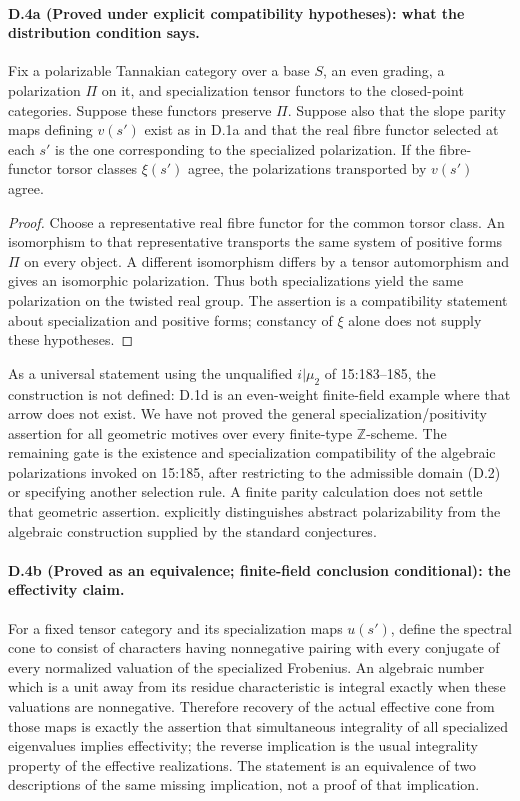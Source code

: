 \paragraph{D.4a (Proved under explicit compatibility hypotheses): what the distribution condition says.}
Fix a polarizable Tannakian category over a base $S$, an even grading,
a polarization $\Pi$ on it, and specialization tensor functors to the
closed-point categories. Suppose these functors preserve $\Pi$. Suppose
also that the slope parity maps defining $v(s')$ exist as in D.1a and
that the real fibre functor selected at each $s'$ is the one corresponding
to the specialized polarization. If the fibre-functor torsor classes
$\xi(s')$ agree, the polarizations transported by $v(s')$ agree.

\begin{proof}
Choose a representative real fibre functor for the common torsor class.
An isomorphism to that representative transports the same system of
positive forms $\Pi$ on every object. A different isomorphism differs
by a tensor automorphism and gives an isomorphic polarization. Thus both
specializations yield the same polarization on the twisted real group.
The assertion is a compatibility statement about specialization and
positive forms; constancy of $\xi$ alone does not supply these hypotheses.
\end{proof}

As a universal statement using the unqualified $i|\mu _2$ of 15:183--185,
the construction is not defined: D.1d is an even-weight finite-field
example where that arrow does not exist. We have not proved the general
specialization/positivity assertion for all geometric motives over every
finite-type $\mathbb Z$-scheme. The remaining gate is the existence and
specialization compatibility of the algebraic polarizations invoked on
15:185, after restricting to the admissible domain (D.2) or specifying
another selection rule. A finite parity calculation does not settle that
geometric assertion. \citet[Remark 2.47]{D_Milne1994} explicitly distinguishes
abstract polarizability from the algebraic construction supplied by the
standard conjectures.

\paragraph{D.4b (Proved as an equivalence; finite-field conclusion conditional): the effectivity claim.}
For a fixed tensor category and its specialization maps $u(s')$, define the
spectral cone to consist of characters having nonnegative pairing with
every conjugate of every normalized valuation of the specialized Frobenius.
An algebraic number which is a unit away from its residue characteristic
is integral exactly when these valuations are nonnegative. Therefore
recovery of the actual effective cone from those maps is exactly the
assertion that simultaneous integrality of all specialized eigenvalues
implies effectivity; the reverse implication is the usual integrality
property of the effective realizations. The statement is an equivalence
of two descriptions of the same missing implication, not a proof of that
implication.


